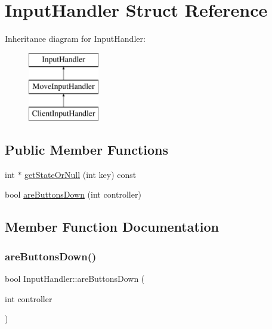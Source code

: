 \hypertarget{struct_input_handler}{}\section{Input\+Handler Struct Reference}
\label{struct_input_handler}
Inheritance diagram for Input\+Handler\+:\begin{figure}[H]
\begin{center}
\leavevmode
\includegraphics[height=3.000000cm]{struct_input_handler}
\end{center}
\end{figure}
\subsection*{Public Member Functions}
\begin{DoxyCompactItemize}
\item 
int $\ast$ \mbox{\hyperlink{struct_input_handler_ac6ce21361da184ee3d3a5b47768d1243}{get\+State\+Or\+Null}} (int key) const
\item 
bool \mbox{\hyperlink{struct_input_handler_aa43d955e2c0627c3158816fb5d8cc410}{are\+Buttons\+Down}} (int controller)
\end{DoxyCompactItemize}


\subsection{Member Function Documentation}
\mbox{\label{struct_input_handler_aa43d955e2c0627c3158816fb5d8cc410}} 
\subsubsection{\texorpdfstring{areButtonsDown()}{areButtonsDown()}}
{\footnotesize\ttfamily bool Input\+Handler\+::are\+Buttons\+Down (\begin{DoxyParamCaption}\item[{int}]{controller }\end{DoxyParamCaption})}

